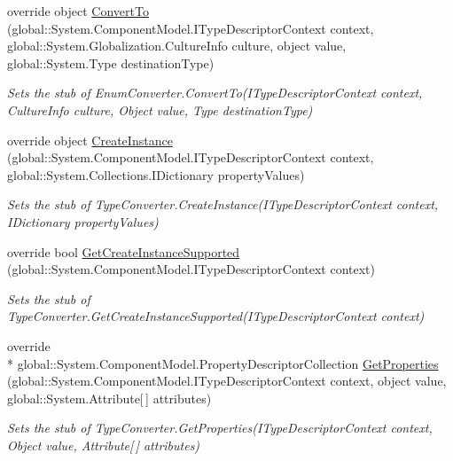 \begin{DoxyCompactItemize}
override object \hyperlink{class_system_1_1_component_model_1_1_fakes_1_1_stub_enum_converter_ae916fd8045917af261cebec0925f8b14}{Convert\-To} (global\-::\-System.\-Component\-Model.\-I\-Type\-Descriptor\-Context context, global\-::\-System.\-Globalization.\-Culture\-Info culture, object value, global\-::\-System.\-Type destination\-Type)
\begin{DoxyCompactList}\small\item\em Sets the stub of Enum\-Converter.\-Convert\-To(\-I\-Type\-Descriptor\-Context context, Culture\-Info culture, Object value, Type destination\-Type)\end{DoxyCompactList}\item 
override object \hyperlink{class_system_1_1_component_model_1_1_fakes_1_1_stub_enum_converter_a0e41ef097a7b6048196f847abfd2bda5}{Create\-Instance} (global\-::\-System.\-Component\-Model.\-I\-Type\-Descriptor\-Context context, global\-::\-System.\-Collections.\-I\-Dictionary property\-Values)
\begin{DoxyCompactList}\small\item\em Sets the stub of Type\-Converter.\-Create\-Instance(\-I\-Type\-Descriptor\-Context context, I\-Dictionary property\-Values)\end{DoxyCompactList}\item 
override bool \hyperlink{class_system_1_1_component_model_1_1_fakes_1_1_stub_enum_converter_a5e1ccd9902e21b33b9b00515a0dc8e1c}{Get\-Create\-Instance\-Supported} (global\-::\-System.\-Component\-Model.\-I\-Type\-Descriptor\-Context context)
\begin{DoxyCompactList}\small\item\em Sets the stub of Type\-Converter.\-Get\-Create\-Instance\-Supported(\-I\-Type\-Descriptor\-Context context)\end{DoxyCompactList}\item 
override \\*
global\-::\-System.\-Component\-Model.\-Property\-Descriptor\-Collection \hyperlink{class_system_1_1_component_model_1_1_fakes_1_1_stub_enum_converter_aecde764ef78519853c4c9e0df70131a0}{Get\-Properties} (global\-::\-System.\-Component\-Model.\-I\-Type\-Descriptor\-Context context, object value, global\-::\-System.\-Attribute\mbox{[}$\,$\mbox{]} attributes)
\begin{DoxyCompactList}\small\item\em Sets the stub of Type\-Converter.\-Get\-Properties(\-I\-Type\-Descriptor\-Context context, Object value, Attribute\mbox{[}$\,$\mbox{]} attributes)\end{DoxyCompactList}\item 

\end{DoxyCompactItemize}
